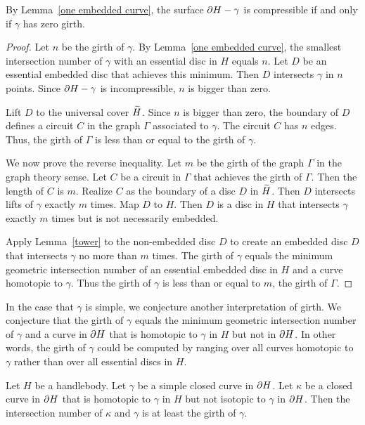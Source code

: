 By Lemma~\ref{one embedded curve}, the surface $\partial H-\gamma$ is compressible if and only if $\gamma$ has zero girth.  

\begin{proof}
Let $n$ be the girth of $\gamma$.  By Lemma~\ref{one embedded curve}, the smallest intersection number of $\gamma$ with an essential disc in $H$ equals $n$.  Let $D$ be an essential embedded disc that achieves this minimum.  Then $D$ intersects $\gamma$ in $n$ points.  Since $\partial H-\gamma$ is incompressible, $n$ is bigger than zero.

Lift $D$ to the universal cover $\widetilde{H}$.  Since $n$ is bigger than zero, the boundary of $D$ defines a circuit $C$ in the graph $\Gamma$ associated to $\gamma$.  The circuit $C$ has $n$ edges.  Thus, the girth of $\Gamma$ is less than or equal to the girth of $\gamma$.

We now prove the reverse inequality.  Let $m$ be the girth of the graph $\Gamma$ in the graph theory sense.  Let $C$ be a circuit in $\Gamma$ that achieves the girth of $\Gamma$.  Then the length of $C$ is $m$.  Realize $C$ as the boundary of a disc $D$ in $\widetilde{H}$.  Then $D$ intersects lifts of $\gamma$ exactly $m$ times. Map $D$ to $H$.  Then $D$ is a disc in $H$ that intersects $\gamma$ exactly $m$ times but is not necessarily embedded.

Apply Lemma~\ref{tower} to the non-embedded disc $D$ to create an embedded disc $D$ that intersects $\gamma$ no more than $m$ times.  
The girth of $\gamma$ equals the minimum geometric intersection number of an essential embedded disc in $H$ and a curve homotopic to $\gamma$.  Thus the girth of $\gamma$ is less than or equal to $m$, the girth of $\Gamma$.
\end{proof}

In the case that $\gamma$ is simple, we conjecture another interpretation of girth.  We conjecture that the girth of $\gamma$ equals the minimum geometric intersection number of $\gamma$ and a curve in $\partial H$ that is homotopic to $\gamma$ in $H$ but not in $\partial H$.  In other words, the girth of $\gamma$ could be computed by ranging over all curves homotopic to $\gamma$ rather than over all essential discs in $H$.

\begin{conjecture}
\label{special conjecture}
Let $H$ be a handlebody.  Let $\gamma$ be a simple closed curve 
in $\partial H$.  Let $\kappa$ be a closed curve in $\partial H$ 
that is homotopic to $\gamma$ in $H$ but not isotopic to 
$\gamma$ in $\partial H$.  Then the intersection number of $\kappa$ and 
$\gamma$ is at least the girth of $\gamma$.
\end{conjecture}

